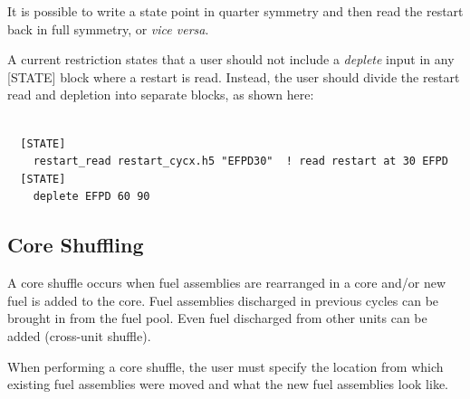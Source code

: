 It is possible to write a state point in quarter symmetry and then read the restart back in full symmetry,
or \textit{vice versa}.

A current restriction states that a user should not include a {\it deplete} input in any
[STATE] block where a restart is read. Instead, the user should divide the restart read and depletion
into separate blocks, as shown here:
\begin{Verbatim}[fontsize=\small]

  [STATE]
    restart_read restart_cycx.h5 "EFPD30"  ! read restart at 30 EFPD
  [STATE]
    deplete EFPD 60 90

\end{Verbatim}


\subsection{Core Shuffling}

A core shuffle occurs when fuel assemblies are rearranged in a core and/or new fuel is added to the core.
Fuel assemblies discharged in previous cycles can be brought in from the fuel pool.
Even fuel discharged from other units can be added (cross-unit shuffle).

When performing a core shuffle, the user must specify the location from which existing fuel assemblies were moved
and what the new fuel assemblies look like.


